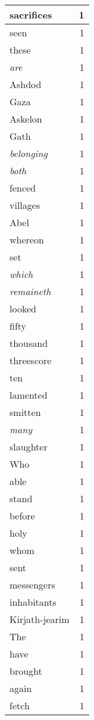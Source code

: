 \begin{center}
\begin{longtable}{l|r}
sacrifices & 1 \\ \hline
seen & 1 \\ \hline
these & 1 \\ \hline
\emph{are} & 1 \\ \hline
Ashdod & 1 \\ \hline
Gaza & 1 \\ \hline
Askelon & 1 \\ \hline
Gath & 1 \\ \hline
\emph{belonging} & 1 \\ \hline
\emph{both} & 1 \\ \hline
fenced & 1 \\ \hline
villages & 1 \\ \hline
Abel & 1 \\ \hline
whereon & 1 \\ \hline
set & 1 \\ \hline
\emph{which} & 1 \\ \hline
\emph{remaineth} & 1 \\ \hline
looked & 1 \\ \hline
fifty & 1 \\ \hline
thousand & 1 \\ \hline
threescore & 1 \\ \hline
ten & 1 \\ \hline
lamented & 1 \\ \hline
smitten & 1 \\ \hline
\emph{many} & 1 \\ \hline
slaughter & 1 \\ \hline
Who & 1 \\ \hline
able & 1 \\ \hline
stand & 1 \\ \hline
before & 1 \\ \hline
holy & 1 \\ \hline
whom & 1 \\ \hline
sent & 1 \\ \hline
messengers & 1 \\ \hline
inhabitants & 1 \\ \hline
Kirjath-jearim & 1 \\ \hline
The & 1 \\ \hline
have & 1 \\ \hline
brought & 1 \\ \hline
again & 1 \\ \hline
fetch & 1 \\ \hline
\end{longtable}
\end{center}



